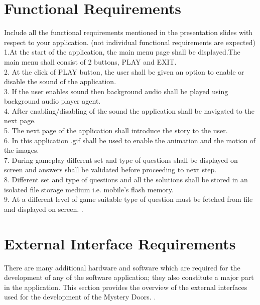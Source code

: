 \section{Functional Requirements}
\hspace{1cm}Include all the functional requirements mentioned in the presentation slides with respect to your application. (not individual functional requirements are expected)
\\ \hspace{0.5cm}1.At the start of the application, the main menu page shall be displayed.The main menu shall consist of 2 buttons, PLAY and EXIT.
\\2. At the click of PLAY button, the user shall be given an option to enable or disable the sound of the application.
\\3. If the user enables sound then background audio shall be played using background audio player agent. 
\\4.	After enabling/disabling of the sound the application shall be navigated to the next page.
\\5.	The next page of the application shall introduce the story to the user.
\\6.	In this application .gif shall be used to enable the animation and the motion of the images. 
\\7.	During gameplay different set and type of questions shall be displayed on screen and answers shall be validated before proceeding to next step.
\\8.	Different set and type of questions and all the solutions shall be stored in an isolated file storage medium i.e. mobile’s flash memory. 
\\9.	At a different level of game suitable type of question must be fetched from file and displayed on screen.
\cite{DBLP:journals/ivc/KadyrovP03}.\\

\section{External Interface Requirements}
\hspace{1cm}There are many additional hardware and software which are required
for the development of any of the software application; they also constitute
a major part in the application. This section provides the overview of the
external interfaces used for the development of the Mystery Doors.
 \cite{DBLP:journals/ivc/KadyrovP03}.\\


